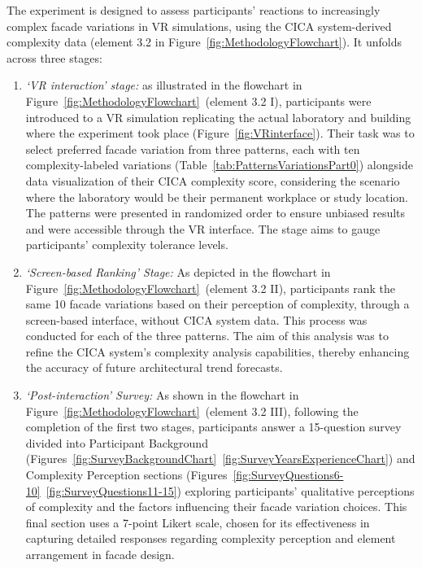 %    


The experiment is designed to assess participants' reactions to increasingly complex facade variations in VR simulations, using the CICA system-derived complexity data (element 3.2 in Figure~\ref{fig:MethodologyFlowchart}). It unfolds across three stages:

\begin{enumerate}
    \item \textit{`VR interaction' stage:}  as illustrated in the flowchart in Figure~\ref{fig:MethodologyFlowchart}~(element 3.2 I), participants were introduced to a VR simulation replicating the actual laboratory and building where the experiment took place (Figure~\ref{fig:VRinterface}).
    Their task was to select preferred facade variation from three patterns, each with ten complexity-labeled variations (Table~\ref{tab:PatternsVariationsPart0}) alongside data visualization of their CICA complexity score, considering the scenario where the laboratory would be their permanent workplace or study location.
    The patterns were presented in randomized order to ensure unbiased results and were accessible through the VR interface.
    The stage aims to gauge participants' complexity tolerance levels.
    \item \textit{`Screen-based Ranking' Stage:} As depicted in the flowchart in Figure~\ref{fig:MethodologyFlowchart}~(element 3.2 II), participants rank the same 10 facade variations based on their perception of complexity, through a screen-based interface, without CICA system data.
    This process was conducted for each of the three patterns.
    The aim of this analysis was to refine the CICA system's complexity analysis capabilities, thereby enhancing the accuracy of future architectural trend forecasts.
    \item \textit{`Post-interaction' Survey:} As shown in the flowchart in Figure~\ref{fig:MethodologyFlowchart}~(element 3.2 III), following the completion of the first two stages, participants answer a 15-question survey divided into Participant Background (Figures~\ref{fig:SurveyBackgroundChart}~\ref{fig:SurveyYearsExperienceChart}) and Complexity Perception sections (Figures~\ref{fig:SurveyQuestions6-10}~\ref{fig:SurveyQuestions11-15}) exploring participants' qualitative perceptions of complexity and the factors influencing their facade variation choices.
    This final section uses a 7-point Likert scale, chosen for its effectiveness in capturing detailed responses regarding complexity perception and element arrangement in facade design.
\end{enumerate}

